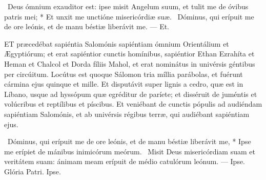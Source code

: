 \R\ Deus ómnium exauditor est: ipse misit Angelum suum, et tulit me de óvibus patris mei; * Et unxit me unctióne misericórdiæ suæ. \V\ Dóminus, qui erípuit me de ore leónis, et de manu béstiæ liberávit me. --- Et.



\lettrine[lines=2]{E}{T} præcedébat sapiéntia Salomónis sapiéntiam ómnium Orientálium et Ægyptiórum; et erat sapiéntior cunctis homínibus, sapiéntior Ethan Ezrahíta et Heman et Chalcol et Dorda fíliis Mahol, et erat nominátus in univérsis géntibus per circúitum. Locútus est quoque Sálomon tria míllia parábolas, et fuérunt cármina ejus quinque et mille. Et disputávit super lignis a cedro, quæ est in Líbano, usque ad hyssópum quæ egréditur de paríete; et disséruit de juméntis et volúcribus et reptílibus et píscibus. Et veniébant de cunctis pópulis ad audiéndam sapiéntiam Salomónis, et ab univérsis régibus terræ, qui audiébant sapiéntiam ejus.

\R\ Dóminus, qui erípuit me de ore leónis, et de manu béstiæ liberávit me, * Ipse me erípiet de mánibus inimicórum meórum. \V\ Misit Deus misericórdiam suam et veritátem suam: ánimam meam erípuit de médio catulórum leónum. --- Ipse. Glória Patri. Ipse.




